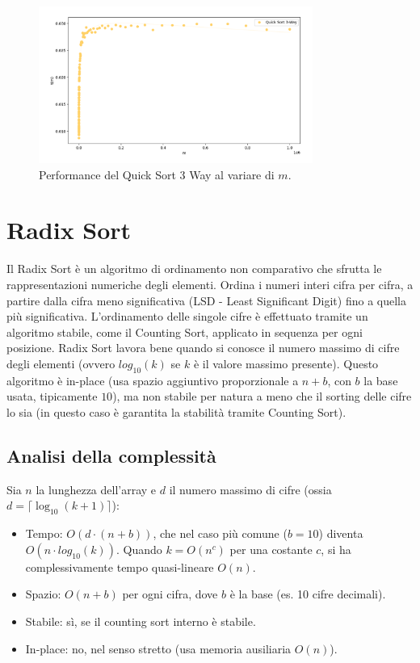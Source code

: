 \documentclass[a4paper, 12pt, oneside]{book}
\begin{document}
\begin{figure}[H]
    \centering
    \includegraphics[width=0.8\textwidth]{images/grafico_quick_sort_3_way_m.png}
    \caption{Performance del Quick Sort 3 Way al variare di \(m\).}
    \label{fig:quick_sort_3_way_m}
\end{figure}



\chapter{Radix Sort}\label{chap:Radix Sort} %

Il Radix Sort è un algoritmo di ordinamento non comparativo che sfrutta le rappresentazioni numeriche degli elementi. Ordina i numeri interi cifra per cifra, a partire dalla cifra meno significativa (LSD - Least Significant Digit) fino a quella più significativa. L'ordinamento delle singole cifre è effettuato tramite un algoritmo stabile, come il Counting Sort, applicato in sequenza per ogni posizione.
Radix Sort lavora bene quando si conosce il numero massimo di cifre degli elementi (ovvero \(log_{10}(k)\) se \(k\) è il valore massimo presente).
Questo algoritmo è in-place (usa spazio aggiuntivo proporzionale a \(n + b\), con \(b\) la base usata, tipicamente \(10\)), ma non stabile per natura a meno che il sorting delle cifre lo sia (in questo caso è garantita la stabilità tramite Counting Sort).

\section{Analisi della complessità}
Sia \(n\) la lunghezza dell'array e \(d\) il numero massimo di cifre (ossia \( d = \lceil \log_{10}(k + 1) \rceil \)): \\

\begin{itemize}
    \item Tempo: \(O(d \cdot (n + b))\), che nel caso più comune (\(b = 10\)) diventa \(O(n \cdot log_{10}(k))\). Quando \(k = O(n^c)\) per una costante \(c\), si ha complessivamente tempo quasi-lineare \(O(n)\).
    \item Spazio: \(O(n + b)\) per ogni cifra, dove \(b\) è la base (es. 10 cifre decimali).
    \item Stabile: sì, se il counting sort interno è stabile.
    \item In-place: no, nel senso stretto (usa memoria ausiliaria \(O(n)\)).
\end{itemize}
\end{document}
